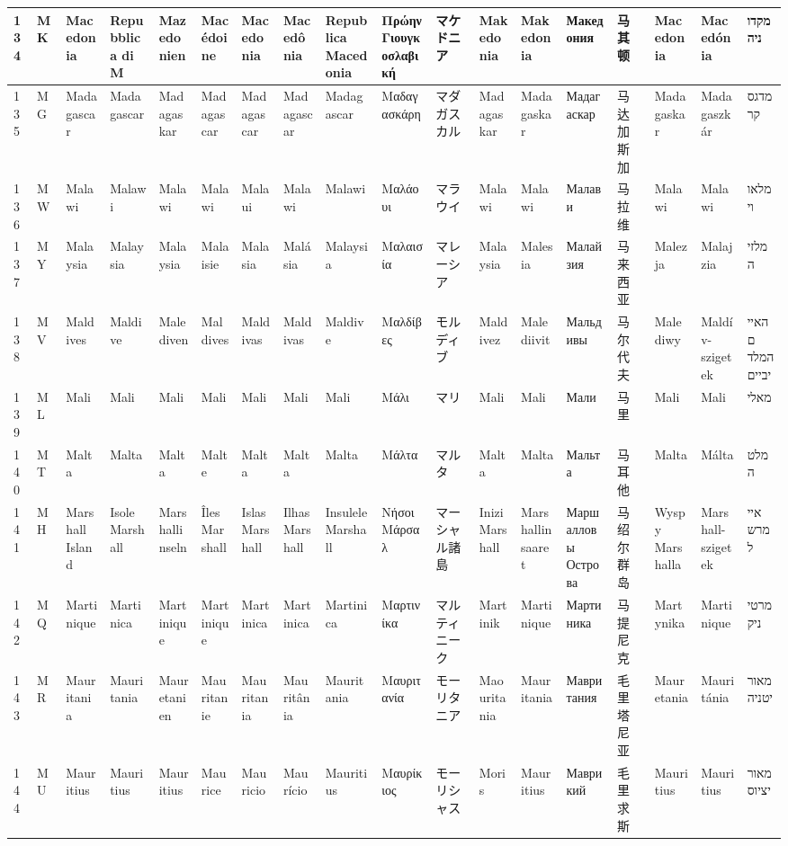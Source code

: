 \begin{longtable}{|l|l|l|l|l|l|l|l|l|l|l|l|l|l|l|l|l|l|}
134 & MK & Macedonia & Repubblica di M & Mazedonien & Macédoine & Macedonia & Macedônia & Republica Macedonia & Πρώην Γιουγκοσλαβική & マケドニア & Makedonia & Makedonia & Македония & 马其顿 & Macedonia & Macedónia & מקדוניה \\ \hline 
135 & MG & Madagascar & Madagascar & Madagaskar & Madagascar & Madagascar & Madagascar & Madagascar & Μαδαγασκάρη & マダガスカル & Madagaskar & Madagaskar & Мадагаскар & 马达加斯加 & Madagaskar & Madagaszkár & מדגסקר \\ \hline 
136 & MW & Malawi & Malawi & Malawi & Malawi & Malaui & Malawi & Malawi & Μαλάουι & マラウイ & Malawi & Malawi & Малави & 马拉维 & Malawi & Malawi & מלאווי \\ \hline 
137 & MY & Malaysia & Malaysia & Malaysia & Malaisie & Malasia & Malásia & Malaysia & Μαλαισία & マレーシア & Malaysia & Malesia & Малайзия & 马来西亚 & Malezja & Malajzia & מלזיה \\ \hline 
138 & MV & Maldives & Maldive & Malediven & Maldives & Maldivas & Maldivas & Maldive & Μαλδίβες & モルディブ & Maldivez & Malediivit & Мальдивы & 马尔代夫 & Malediwy & Maldív-szigetek & האיים המלדיביים \\ \hline 
139 & ML & Mali & Mali & Mali & Mali & Mali & Mali & Mali & Μάλι & マリ & Mali & Mali & Мали & 马里 & Mali & Mali & מאלי \\ \hline 
140 & MT & Malta & Malta & Malta & Malte & Malta & Malta & Malta & Μάλτα & マルタ & Malta & Malta & Мальта & 马耳他 & Malta & Málta & מלטה \\ \hline 
141 & MH & Marshall Island & Isole Marshall & Marshallinseln & Îles Marshall & Islas Marshall & Ilhas Marshall & Insulele Marshall & Νήσοι Μάρσαλ & マーシャル諸島 & Inizi Marshall & Marshallinsaaret & Маршалловы Острова & 马绍尔群岛 & Wyspy Marshalla & Marshall-szigetek & איי מרשל \\ \hline 
142 & MQ & Martinique & Martinica & Martinique & Martinique & Martinica & Martinica & Martinica & Μαρτινίκα & マルティニーク & Martinik & Martinique & Мартиника & 马提尼克 & Martynika & Martinique & מרטיניק \\ \hline 
143 & MR & Mauritania & Mauritania & Mauretanien & Mauritanie & Mauritania & Mauritânia & Mauritania & Μαυριτανία & モーリタニア & Maouritania & Mauritania & Мавритания & 毛里塔尼亚 & Mauretania & Mauritánia & מאוריטניה \\ \hline 
144 & MU & Mauritius & Mauritius & Mauritius & Maurice & Mauricio & Maurício & Mauritius & Μαυρίκιος & モーリシャス & Moris & Mauritius & Маврикий & 毛里求斯 & Mauritius & Mauritius & מאוריציוס \\ \hline 

\end{longtable}
